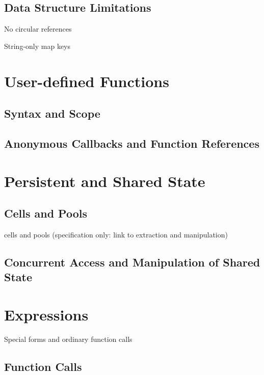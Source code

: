 \documentclass{article}
\begin{document}
\subsection{Data Structure Limitations}

No circular references

String-only map keys

\pagebreak

\section{User-defined Functions}

\subsection{Syntax and Scope}

\subsection{Anonymous Callbacks and Function References}

\pagebreak

\section{Persistent and Shared State}

\subsection{Cells and Pools}

cells and pools (specification only: link to extraction and manipulation)

\subsection{Concurrent Access and Manipulation of Shared State}

\pagebreak

\section{Expressions}

Special forms and ordinary function calls

\subsection{Function Calls}
\end{document}
